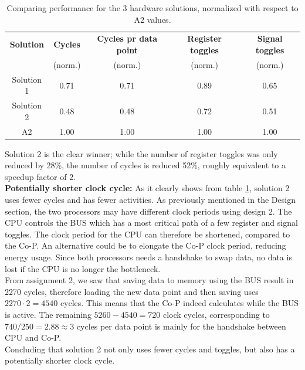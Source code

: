 \begin{table}[H]
    \centering
    \begin{tabular}{|c|c|c|c|c|}
    \hline 
    \textbf{Solution}   & \textbf{Cycles} & \textbf{Cycles pr data point} & \textbf{Register toggles} & \textbf{Signal toggles} \\ 
     & (norm.) & (norm.) & (norm.) & (norm.) \\\hline
    Solution 1 & 0.71   & 0.71          & 0.89            & 0.65         \\ \hline
    Solution 2 & 0.48   & 0.48           & 0.72            & 0.51          \\ \hline
    A2       & 1.00  & 1.00           & 1.00           & 1.00         \\ \hline
    \end{tabular} 
    \caption{Comparing performance for the 3 hardware solutions, normalized with respect to A2 values.}
    \label{tab:performanceNorm}
\end{table}

Solution 2 is the clear winner; while the number of register toggles was only reduced by 28\%, the number of cycles is reduced 52\%, roughly equivalent to a speedup factor of 2. \\

\textbf{Potentially shorter clock cycle:} As it clearly shows from table \ref{tab:performanceNorm}, solution 2 uses fewer cycles and has fewer activities. As previously mentioned in the Design section, the two processors may have different clock periods using design 2. The CPU controls the BUS which has a most critical path of a few register and signal toggles. The clock period for the CPU can therefore be shortened, compared to the Co-P. An alternative could be to elongate the Co-P clock period, reducing energy usage. Since both processors needs a handshake to swap data, no data is lost if the CPU is no longer the bottleneck. \\

From assignment 2, we saw that saving data to memory using the BUS result in 2270 cycles, therefore loading the new data point and then saving uses $2270 \cdot 2 = 4540$ cycles. This means that the Co-P indeed calculates while the BUS is active. The remaining $5260-4540 = 720$ clock cycles, corresponding to $740/250 = 2.88 \approx 3$ cycles per data point is mainly for the handshake between CPU and Co-P. \\

Concluding that solution 2 not only uses fewer cycles and toggles, but also has a potentially shorter clock cycle. 

